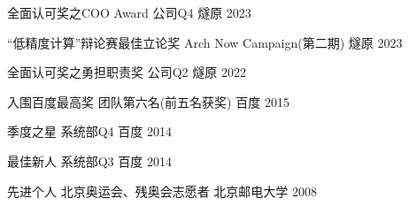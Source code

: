 
\begin{cvhonors}

  \cvhonor
    {全面认可奖之COO Award} %
    {公司Q4} %
    {燧原} %
    {2023} %

  \cvhonor
    {“低精度计算”辩论赛最佳立论奖} %
    {Arch Now Campaign(第二期)} %
    {燧原} %
    {2023} %

  \cvhonor
    {全面认可奖之勇担职责奖} %
    {公司Q2} %
    {燧原} %
    {2022} %

  \cvhonor
    {入围百度最高奖} %
    {团队第六名(前五名获奖)} %
    {百度} %
    {2015} %

  \cvhonor
    {季度之星} %
    {系统部Q4} %
    {百度} %
    {2014} %

  \cvhonor
    {最佳新人} %
    {系统部Q3} %
    {百度} %
    {2014} %

  \cvhonor
    {先进个人} %
    {北京奥运会、残奥会志愿者} %
    {北京邮电大学} %
    {2008} %

\end{cvhonors}
